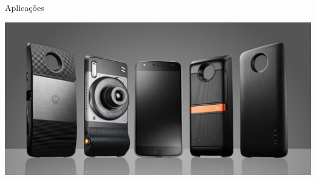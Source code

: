 \documentclass[aspectratio=169]{beamer}
\begin{document}
\begin{frame}{Aplicações}
\begin{minipage}{0.5\textwidth}
\begin{overprint}
	\centering\includegraphics[width=0.95\linewidth]{moto.jpg}
  \end{overprint}
\end{minipage}

\end{frame}
\end{document}
